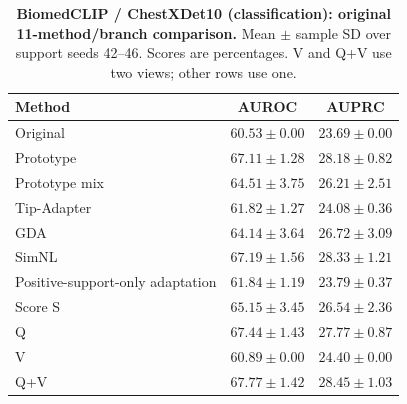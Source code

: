 \begin{table}[tp]
\centering
\caption{\textbf{BiomedCLIP / ChestXDet10 (classification): original 11-method/branch comparison.} Mean $\pm$ sample SD over support seeds 42--46. Scores are percentages. V and Q+V use two views; other rows use one.}
\label{tab:supp-oldmeans-biomedclip-chestxdet10}
\small
\setlength{\tabcolsep}{4pt}
\begin{tabular*}{\textwidth}{@{\extracolsep{\fill}}lcc@{}}
\toprule
Method & AUROC & AUPRC \\
\midrule
Original & $60.53\pm0.00$ & $23.69\pm0.00$ \\
Prototype & $67.11\pm1.28$ & $28.18\pm0.82$ \\
Prototype mix & $64.51\pm3.75$ & $26.21\pm2.51$ \\
Tip-Adapter & $61.82\pm1.27$ & $24.08\pm0.36$ \\
GDA & $64.14\pm3.64$ & $26.72\pm3.09$ \\
SimNL & $67.19\pm1.56$ & $28.33\pm1.21$ \\
Positive-support-only adaptation & $61.84\pm1.19$ & $23.79\pm0.37$ \\
Score S & $65.15\pm3.45$ & $26.54\pm2.36$ \\
Q & $67.44\pm1.43$ & $27.77\pm0.87$ \\
V & $60.89\pm0.00$ & $24.40\pm0.00$ \\
Q+V & $67.77\pm1.42$ & $28.45\pm1.03$ \\
\bottomrule
\end{tabular*}
\end{table}
